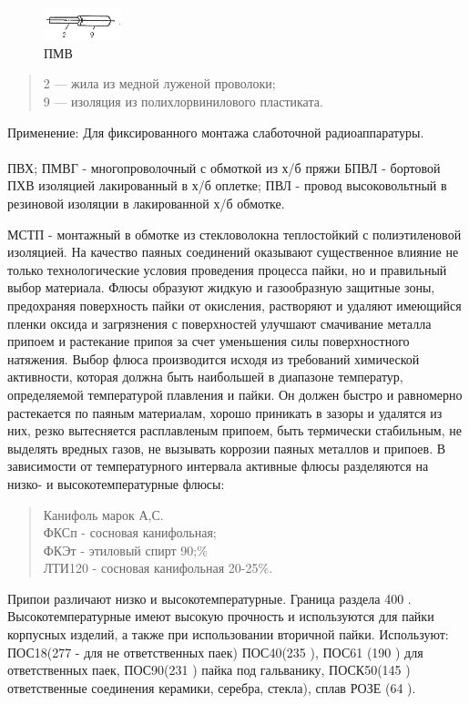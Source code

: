 \documentclass[unicode, 12pt, a4paper, oneside]{article}
\begin{document}
\begin{figure}[H]
\centering
\includegraphics[width=0.2\textwidth]{76_PMV.png}
\caption{ПМВ}
\end{figure}

\begin{verse}
2 — жила из медной луженой проволоки;\\ 
9 — изоляция из полихлорвинилового пластиката.\\
\end{verse}
Применение: Для фиксированного монтажа слаботочной радиоаппаратуры.
\\ \\
ПВХ; ПМВГ - многопроволочный с обмоткой из х/б пряжи
БПВЛ - бортовой ПХВ изоляцией лакированный в х/б оплетке; ПВЛ - провод высоковольтный в резиновой изоляции в лакированной х/б обмотке.

МСТП - монтажный в обмотке из стекловолокна теплостойкий с полиэтиленовой изоляцией.
На качество паяных соединений оказывают существенное влияние не только технологические условия проведения процесса пайки, но и правильный выбор материала. Флюсы образуют  жидкую и газообразную защитные зоны, предохраняя поверхность пайки от окисления, растворяют и удаляют имеющийся пленки оксида и загрязнения с поверхностей улучшают смачивание металла припоем и растекание припоя за счет уменьшения силы поверхностного натяжения. Выбор флюса производится исходя из требований химической активности, которая должна быть наибольшей в диапазоне температур, определяемой температурой плавления и пайки. Он должен быстро и равномерно растекается по паяным материалам, хорошо приникать в зазоры и удалятся из них, резко вытесняется расплавленым припоем, быть термически стабильным, не выделять вредных газов, не вызывать коррозии паяных металлов и припоев. В зависимости от температурного интервала активные флюсы разделяются на низко- и высокотемпературные флюсы: 
\begin{verse}
Канифоль марок А,С.\\
ФКСп - сосновая канифольная;\\ 
ФКЭт - этиловый спирт 90;\%\\
ЛТИ120 - сосновая канифольная 20-25\%.\\
\end{verse}

Припои различают низко и высокотемпературные. Граница раздела 400 \textcelsius. Высокотемпературные имеют высокую прочность и используются для пайки корпусных изделий, а также при использовании вторичной пайки. Используют: ПОС18(277 \textcelsius - для не ответственных паек) ПОС40(235 \textcelsius), ПОС61 (190 \textcelsius) для ответственных паек, ПОС90(231 \textcelsius) пайка под гальванику, ПОСК50(145 \textcelsius) ответственные соединения керамики, серебра, стекла), сплав РОЗЕ (64 \textcelsius).
\end{document}
